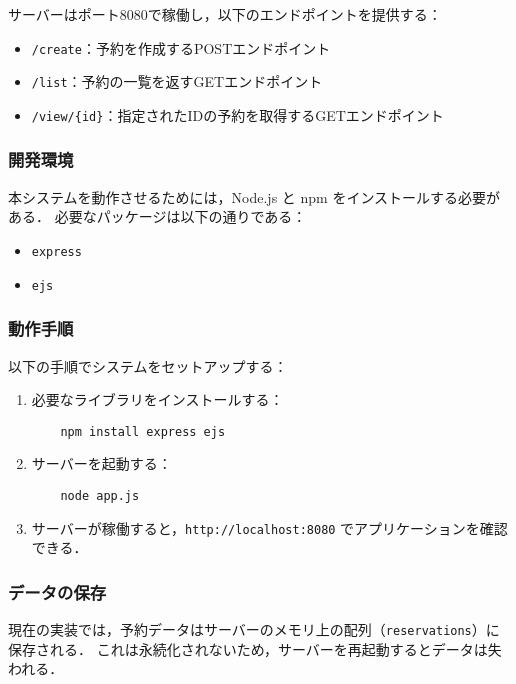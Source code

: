 \documentclass[uplatex,dvipdfmx]{jsarticle}
\begin{document}
サーバーはポート8080で稼働し，以下のエンドポイントを提供する：
\begin{itemize}
    \item \texttt{/create}：予約を作成するPOSTエンドポイント
    \item \texttt{/list}：予約の一覧を返すGETエンドポイント
    \item \texttt{/view/\{id\}}：指定されたIDの予約を取得するGETエンドポイント
\end{itemize}

\subsubsection{開発環境}
本システムを動作させるためには，Node.js と npm をインストールする必要がある．
必要なパッケージは以下の通りである：
\begin{itemize}
    \item \texttt{express}
    \item \texttt{ejs}
\end{itemize}

\subsubsection{動作手順}
以下の手順でシステムをセットアップする：

\begin{enumerate}
    \item 必要なライブラリをインストールする：
    \begin{verbatim}
    npm install express ejs
    \end{verbatim}
    \item サーバーを起動する：
    \begin{verbatim}
    node app.js
    \end{verbatim}
    \item サーバーが稼働すると，\texttt{http://localhost:8080} でアプリケーションを確認できる．
\end{enumerate}

\subsubsection{データの保存}
現在の実装では，予約データはサーバーのメモリ上の配列（\texttt{reservations}）に保存される．
これは永続化されないため，サーバーを再起動するとデータは失われる．
\end{document}
